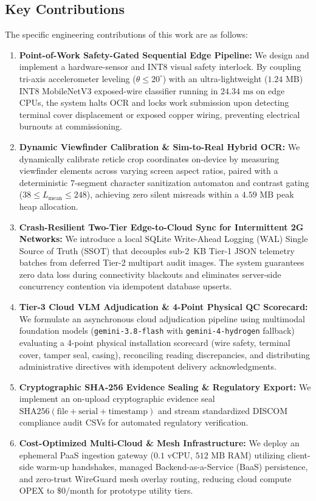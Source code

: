 \documentclass[conference]{IEEEtran}
\begin{document}
\subsection{Key Contributions}
The specific engineering contributions of this work are as follows:
\begin{enumerate}
    \item \textbf{Point-of-Work Safety-Gated Sequential Edge Pipeline:} We design and implement a hardware-sensor and INT8 visual safety interlock. By coupling tri-axis accelerometer leveling ($\theta \le 20^\circ$) with an ultra-lightweight ($1.24\text{~MB}$) INT8 MobileNetV3 exposed-wire classifier running in $24.34\text{~ms}$ on edge CPUs, the system halts OCR and locks work submission upon detecting terminal cover displacement or exposed copper wiring, preventing electrical burnouts at commissioning.
    \item \textbf{Dynamic Viewfinder Calibration \& Sim-to-Real Hybrid OCR:} We dynamically calibrate reticle crop coordinates on-device by measuring viewfinder elements across varying screen aspect ratios, paired with a deterministic 7-segment character sanitization automaton and contrast gating ($38 \le L_{\text{mean}} \le 248$), achieving zero silent misreads within a $4.59\text{~MB}$ peak heap allocation.
    \item \textbf{Crash-Resilient Two-Tier Edge-to-Cloud Sync for Intermittent 2G Networks:} We introduce a local SQLite Write-Ahead Logging (WAL) Single Source of Truth (SSOT) that decouples sub-2~KB Tier-1 JSON telemetry batches from deferred Tier-2 multipart audit images. The system guarantees zero data loss during connectivity blackouts and eliminates server-side concurrency contention via idempotent database upserts.
    \item \textbf{Tier-3 Cloud VLM Adjudication \& 4-Point Physical QC Scorecard:} We formulate an asynchronous cloud adjudication pipeline using multimodal foundation models (\texttt{gemini-3.8-flash} with \texttt{gemini-4-hydrogen} fallback)~\cite{gemini2023team} evaluating a 4-point physical installation scorecard (wire safety, terminal cover, tamper seal, casing), reconciling reading discrepancies, and distributing administrative directives with idempotent delivery acknowledgments.
    \item \textbf{Cryptographic SHA-256 Evidence Sealing \& Regulatory Export:} We implement an on-upload cryptographic evidence seal $\text{SHA256}(\text{file} + \text{serial} + \text{timestamp})$ and stream standardized DISCOM compliance audit CSVs for automated regulatory verification.
    \item \textbf{Cost-Optimized Multi-Cloud \& Mesh Infrastructure:} We deploy an ephemeral PaaS ingestion gateway ($0.1\text{~vCPU}$, $512\text{~MB}$ RAM) utilizing client-side warm-up handshakes, managed Backend-as-a-Service (BaaS) persistence, and zero-trust WireGuard mesh overlay routing, reducing cloud compute OPEX to $\$0/\text{month}$ for prototype utility tiers.
\end{enumerate}
\end{document}
